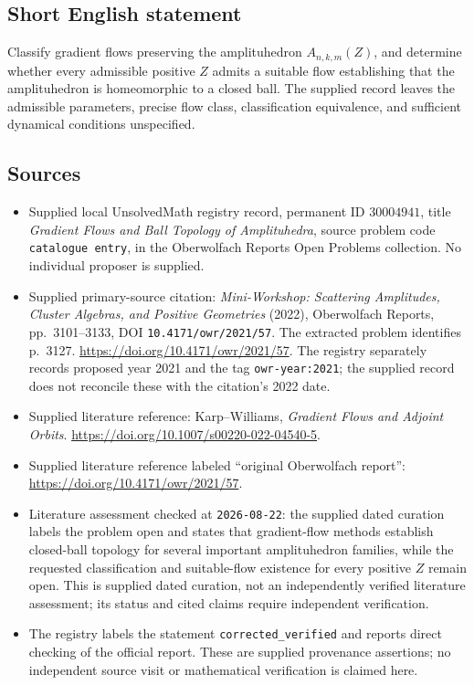 \documentclass[11pt]{article}
\begin{document}
\subsection{Short English statement}
Classify gradient flows preserving the amplituhedron \(A_{n,k,m}(Z)\), and determine whether every admissible positive \(Z\) admits a suitable flow establishing that the amplituhedron is homeomorphic to a closed ball. The supplied record leaves the admissible parameters, precise flow class, classification equivalence, and sufficient dynamical conditions unspecified.
\subsection{Sources}
\begin{itemize}
\item Supplied local UnsolvedMath registry record, permanent ID \(30004941\), title \emph{Gradient Flows and Ball Topology of Amplituhedra}, source problem code \texttt{catalogue entry}, in the Oberwolfach Reports Open Problems collection. No individual proposer is supplied.
\item Supplied primary-source citation: \emph{Mini-Workshop: Scattering Amplitudes, Cluster Algebras, and Positive Geometries} (2022), Oberwolfach Reports, pp.\ 3101--3133, DOI \texttt{10.4171/owr/2021/57}. The extracted problem identifies p.\ 3127. \url{https://doi.org/10.4171/owr/2021/57}. The registry separately records proposed year 2021 and the tag \texttt{owr-year:2021}; the supplied record does not reconcile these with the citation's 2022 date.
\item Supplied literature reference: Karp--Williams, \emph{Gradient Flows and Adjoint Orbits}. \url{https://doi.org/10.1007/s00220-022-04540-5}.
\item Supplied literature reference labeled ``original Oberwolfach report'': \url{https://doi.org/10.4171/owr/2021/57}.
\item Literature assessment checked at \texttt{2026-08-22}: the supplied dated curation labels the problem open and states that gradient-flow methods establish closed-ball topology for several important amplituhedron families, while the requested classification and suitable-flow existence for every positive \(Z\) remain open. This is supplied dated curation, not an independently verified literature assessment; its status and cited claims require independent verification.
\item The registry labels the statement \texttt{corrected\_verified} and reports direct checking of the official report. These are supplied provenance assertions; no independent source visit or mathematical verification is claimed here.
\end{itemize}
\end{document}
